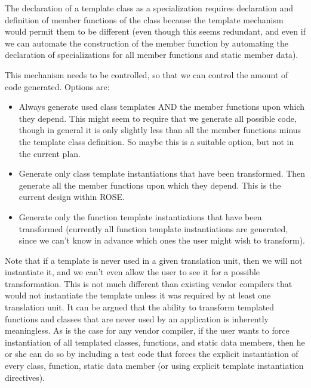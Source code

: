 \begin{enumerate}
\begin{itemize}
                     The declaration of a template class as a
                     specialization requires declaration and definition of member
                     functions of the class because the template mechanism would permit 
                     them to be different (even though this seems redundant, and even if
                     we can automate the construction of the member function by automating 
                     the declaration of specializations for all member functions and
                     static member data).

                     This mechanism needs to be controlled, so that we can control the
                     amount of code generated.  Options are:
                     \begin{itemize}
                         \item Always generate used class templates AND the member
                               functions upon which they depend.  This might seem to
                               require that we generate all possible code, though in general
                               it is only slightly less than all the member
                               functions minus the template class definition.  So maybe
                               this is a suitable option, but not in the current plan.
                         \item Generate only class template instantiations that have been 
                               transformed. Then generate
                               all the member functions upon which they depend. This is
                               the current design within ROSE.
                         \item Generate only the function template instantiations that
                               have been transformed (currently all function template
                               instantiations are generated, since we can't know in
                               advance which ones the user might wish to transform).
                     \end{itemize}
                     Note that if a template is never used in a given translation unit, 
                     then we will not instantiate it, and we can't even allow the user to 
                     see it for a possible transformation.  This is not much different
                     than existing vendor compilers that would not instantiate the template 
                     unless it was required by at least one translation unit.  It can be 
                     argued that the ability to transform templated functions and classes 
                     that are never used by an application is inherently meaningless. As is
                     the case for any vendor compiler, if the user wants to force
                     instantiation of all templated classes, functions, and static data 
                     members, then he or she can do so by including a test code 
                     that forces the explicit instantiation of every class, function,
                     static data member (or using explicit template instantiation directives).


\end{itemize}
\end{enumerate}
